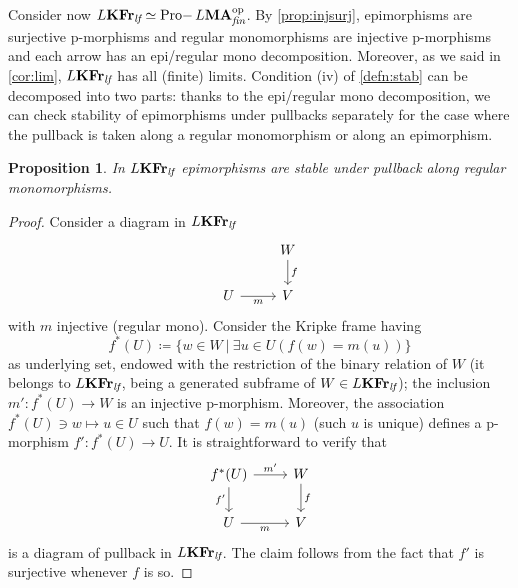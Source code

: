 \documentclass{article}
\newtheorem{prop}{Proposition}
\theoremstyle{definition}
\DeclareMathOperator{\Pro}{Pro-}
\newcommand{\KFr}{\textup{\textbf{KFr}}}
\newcommand{\MA}{\textup{\textbf{MA}}}
\newcommand{\fin}{\textit{fin}}
\newcommand{\lf}{\textit{lf}}
\newcommand{\op}{\textup{op}}
\begin{document}
Consider now $L\KFr_\lf \simeq \Pro L\MA_\fin^\op$. By \cref{prop:injsurj}, epimorphisms are surjective p-morphisms and regular monomorphisms are injective p-morphisms and each arrow has an epi/regular mono decomposition. Moreover, as we said in \cref{cor:lim}, $L\KFr_\lf$ has all (finite) limits. Condition (iv) of \cref{defn:stab} can be decomposed into two parts: thanks to the epi/regular mono decomposition, we can check stability of epimorphisms under pullbacks separately 
for the case where the pullback is taken along a 
 regular monomorphism or along an epimorphism.
\begin{prop}\label{prop:cep}
In $L\KFr_\lf$ epimorphisms are stable under pullback along regular monomorphisms.
\end{prop}
\begin{proof}
Consider a diagram in $L\KFr_\lf$
\[\begin{tikzcd}[ampersand replacement=\&]
	\& W \\
	U \& V
	\arrow["f", from=1-2, to=2-2]
	\arrow["m"', from=2-1, to=2-2]
\end{tikzcd}\]
with $m$ injective (regular mono). Consider the Kripke frame having
$$f^*(U) \coloneqq \{w \in W\ \vert\ \exists u \in U (f(w) = m(u))\}$$
as underlying set, endowed with the restriction of the binary relation of $W$ (it belongs to $L\KFr_\lf$, being a generated subframe of $W \in L\KFr_\lf$); the inclusion $m' \colon f^*(U) \longrightarrow W$ is an injective p-morphism. Moreover, the association $f^*(U) \ni w \mapsto u \in U$ such that $f(w)=m(u)$ (such $u$ is unique) defines a p-morphism $f' \colon f^*(U) \longrightarrow U$. It is straightforward to verify that
\[\begin{tikzcd}[ampersand replacement=\&]
	{f^*(U)} \& W \\
	U \& V
	\arrow["m'", from=1-1, to=1-2]
	\arrow["f'"', from=1-1, to=2-1]
	\arrow["f", from=1-2, to=2-2]
	\arrow["m"', from=2-1, to=2-2]
\end{tikzcd}\]
is a diagram of pullback in $L\KFr_\lf$. The claim follows from the fact that $f'$ is surjective whenever $f$ is so.
\end{proof}
\end{document}
